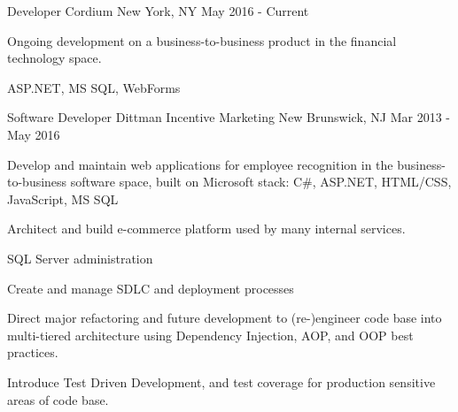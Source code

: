 \documentclass[11pt, letterpaper]{awesome-cv}
\begin{document}


\begin{cventries}
 \cventry
   {Developer}
   {Cordium}
   {New York, NY}
   {May 2016 - Current}
   {
     \begin {cvitems}
       \item {Ongoing development on a business-to-business product in the financial technology space.}
       \item {ASP.NET, MS SQL, WebForms}
     \end {cvitems}
   }
  \cventry
    {Software Developer} %
    {Dittman Incentive Marketing} %
    {New Brunswick, NJ} %
    {Mar 2013 - May 2016} 
    {
      \begin{cvitems} 
        \item {Develop and maintain web applications for employee recognition in the business-to-business software space, built on Microsoft stack: C\#, ASP.NET, HTML/CSS, JavaScript, MS SQL}
        \item {Architect and build e-commerce platform used by many internal services.}
        \item {SQL Server administration}
        \item {Create and manage SDLC and deployment processes}
        \item {Direct major refactoring and future development to (re-)engineer code base into multi-tiered architecture using Dependency Injection, AOP, and OOP best practices.}
	\item {Introduce Test Driven Development, and test coverage for production sensitive areas of code base.}
      \end{cvitems}
    }


\end{cventries}
\end{document}
